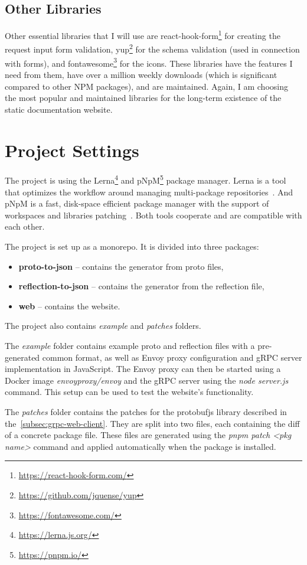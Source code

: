 \subsection{Other Libraries}
Other essential libraries that I will use are react-hook-form\footnote{\url{https://react-hook-form.com/}} for creating the request input form validation, yup\footnote{\url{https://github.com/jquense/yup}} for the schema validation (used in connection with forms), and fontawesome\footnote{\url{https://fontawesome.com/}} for the icons.
These libraries have the features I need from them, have over a million weekly downloads (which is significant compared to other NPM packages), and are maintained.
Again, I am choosing the most popular and maintained libraries for the long-term existence of the static documentation website.


\section{Project Settings}
The project is using the Lerna\footnote{\url{https://lerna.js.org/}} and pNpM\footnote{\url{https://pnpm.io/}} package manager.
Lerna is a tool that optimizes the workflow around managing multi-package repositories~\cite{lerna}.
And pNpM is a fast, disk-space efficient package manager with the support of workspaces and libraries patching~\cite{pnpm}.
Both tools cooperate and are compatible with each other.

The project is set up as a monorepo.
It is divided into three packages:
\begin{itemize}
    \item \textbf{proto-to-json} -- contains the generator from proto files,
    \item \textbf{reflection-to-json} -- contains the generator from the reflection file,
    \item \textbf{web} -- contains the website.
\end{itemize}
The project also contains \textit{example} and \textit{patches} folders.

The \textit{example} folder contains example proto and reflection files with a pre-generated common format, as well as Envoy proxy configuration and gRPC server implementation in JavaScript.
The Envoy proxy can then be started using a Docker image \textit{envoyproxy/envoy} and the gRPC server using the \textit{node server.js} command.
This setup can be used to test the website's functionality.

The \textit{patches} folder contains the patches for the protobufjs library described in the~\ref{subsec:grpc-web-client}.
They are split into two files, each containing the diff of a concrete package file.
These files are generated using the \textit{pnpm patch \textless{}pkg name\textgreater{}} command and applied automatically when the package is installed.

